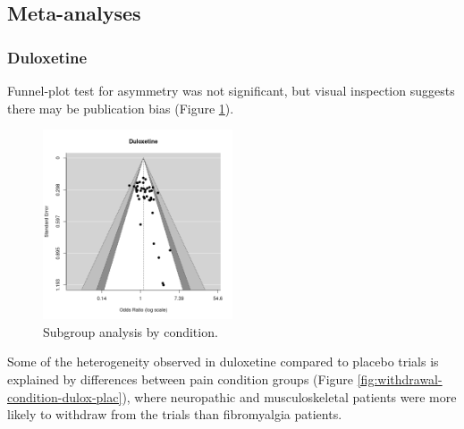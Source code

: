 \documentclass{report}\usepackage[]{graphicx}\usepackage[]{color}
\begin{document}
\subsection{Meta-analyses}

\subsubsection{Duloxetine}

Funnel-plot test for asymmetry was not significant, but visual inspection suggests there may be publication bias (Figure \ref{fig:withdrawal-dulox-plac}).

\begin{figure}
\centering
\includegraphics[width=0.5\textwidth]{img/withdrawalduloxetine-placebo-funnel.png}
\caption[Withdrawal by condition: duloxetine]{
Subgroup analysis by condition. 
}
\label{fig:withdrawal-dulox-plac}
\end{figure}


Some of the heterogeneity observed in duloxetine compared to placebo trials is explained by differences between pain condition groups (Figure \ref{fig:withdrawal-condition-dulox-plac}), where neuropathic and musculoskeletal patients were more likely to withdraw from the trials than fibromyalgia patients.
\end{document}
